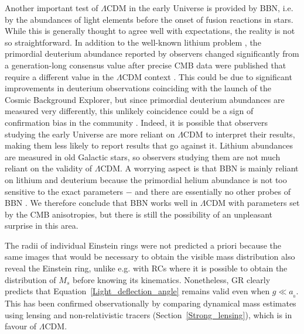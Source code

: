 \documentclass[fleqn,usenatbib,useAMS]{mnras} %
\begin{document}
Another important test of $\Lambda$CDM in the early Universe is provided by BBN, i.e. by the abundances of light elements before the onset of fusion reactions in stars. While this is generally thought to agree well with expectations, the reality is not so straightforward. In addition to the well-known lithium problem \citep{Fields_2011}, the primordial deuterium abundance reported by observers changed significantly from a generation-long consensus value after precise CMB data were published that require a different value in the $\Lambda$CDM context \citep[for a review of pre-CMB constraints, see][]{Tytler_2000}. This could be due to significant improvements in deuterium observations coinciding with the launch of the Cosmic Background Explorer, but since primordial deuterium abundances are measured very differently, this unlikely coincidence could be a sign of confirmation bias in the community \citep[see chapter~6 of][]{Merritt_2020}. Indeed, it is possible that observers studying the early Universe are more reliant on $\Lambda$CDM to interpret their results, making them less likely to report results that go against it. Lithium abundances are measured in old Galactic stars, so observers studying them are not much reliant on the validity of $\Lambda$CDM. A worrying aspect is that BBN is mainly reliant on lithium and deuterium because the primordial helium abundance is not too sensitive to the exact parameters $-$ and there are essentially no other probes of BBN \citep{Cyburt_2016}. We therefore conclude that BBN works well in $\Lambda$CDM with parameters set by the CMB anisotropies, but there is still the possibility of an unpleasant surprise in this area.

The radii of individual Einstein rings were not predicted a priori because the same images that would be necessary to obtain the visible mass distribution also reveal the Einstein ring, unlike e.g. with RCs where it is possible to obtain the distribution of $M_s$ before knowing its kinematics. Nonetheless, GR clearly predicts that Equation~\ref{Light_deflection_angle} remains valid even when $g \ll a_{_0}$. This has been confirmed observationally by comparing dynamical mass estimates using lensing and non-relativistic tracers (Section~\ref{Strong_lensing}), which is in favour of $\Lambda$CDM.
\end{document}
